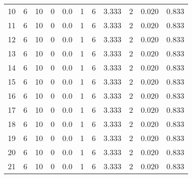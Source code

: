 \begin{tabular}{lrrrrrrrrrr}
10 &        6 &       10 &                 0 &               0.0 &                       1 &                          6 &       3.333 &              2 &       0.020 &             0.833 \\
11 &        6 &       10 &                 0 &               0.0 &                       1 &                          6 &       3.333 &              2 &       0.020 &             0.833 \\
12 &        6 &       10 &                 0 &               0.0 &                       1 &                          6 &       3.333 &              2 &       0.020 &             0.833 \\
13 &        6 &       10 &                 0 &               0.0 &                       1 &                          6 &       3.333 &              2 &       0.020 &             0.833 \\
14 &        6 &       10 &                 0 &               0.0 &                       1 &                          6 &       3.333 &              2 &       0.020 &             0.833 \\
15 &        6 &       10 &                 0 &               0.0 &                       1 &                          6 &       3.333 &              2 &       0.020 &             0.833 \\
16 &        6 &       10 &                 0 &               0.0 &                       1 &                          6 &       3.333 &              2 &       0.020 &             0.833 \\
17 &        6 &       10 &                 0 &               0.0 &                       1 &                          6 &       3.333 &              2 &       0.020 &             0.833 \\
18 &        6 &       10 &                 0 &               0.0 &                       1 &                          6 &       3.333 &              2 &       0.020 &             0.833 \\
19 &        6 &       10 &                 0 &               0.0 &                       1 &                          6 &       3.333 &              2 &       0.020 &             0.833 \\
20 &        6 &       10 &                 0 &               0.0 &                       1 &                          6 &       3.333 &              2 &       0.020 &             0.833 \\
21 &        6 &       10 &                 0 &               0.0 &                       1 &                          6 &       3.333 &              2 &       0.020 &             0.833 \\

\end{tabular}
